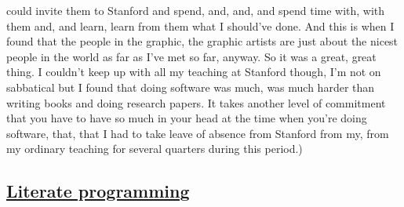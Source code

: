 \documentclass[]{article}
\begin{document}
could invite them to Stanford and spend, and, and, and spend time with,
with them and, and learn, learn from them what I should've done. And
this is when I found that the people in the graphic, the graphic artists
are just about the nicest people in the world as far as I've met so far,
anyway. So it was a great, great thing. I couldn't keep up with all my
teaching at Stanford though, I'm not on sabbatical but I found that
doing software was much, was much harder than writing books and doing
research papers. It takes another level of commitment that you have to
have so much in your head at the time when you're doing software, that,
that I had to take leave of absence from Stanford from my, from my
ordinary teaching for several quarters during this period.)

\subsection{\texorpdfstring{\href{http://webofstories.com/play/17125}{Literate
programming}}{Literate programming}}\label{literate-programming}
\end{document}
